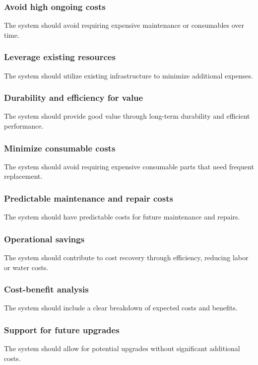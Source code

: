 \documentclass[12pt]{report}
\begin{document}
\subsubsection{Avoid high ongoing costs}
The system should avoid requiring expensive maintenance or consumables over time.

\subsubsection{Leverage existing resources}
The system should utilize existing infrastructure to minimize additional expenses.

\subsubsection{Durability and efficiency for value}
The system should provide good value through long-term durability and efficient performance.

\subsubsection{Minimize consumable costs}
The system should avoid requiring expensive consumable parts that need frequent replacement.

\subsubsection{Predictable maintenance and repair costs}
The system should have predictable costs for future maintenance and repairs.

\subsubsection{Operational savings}
The system should contribute to cost recovery through efficiency, reducing labor or water costs.

\subsubsection{Cost-benefit analysis}
The system should include a clear breakdown of expected costs and benefits.

\subsubsection{Support for future upgrades}
The system should allow for potential upgrades without significant additional costs.
\end{document}
